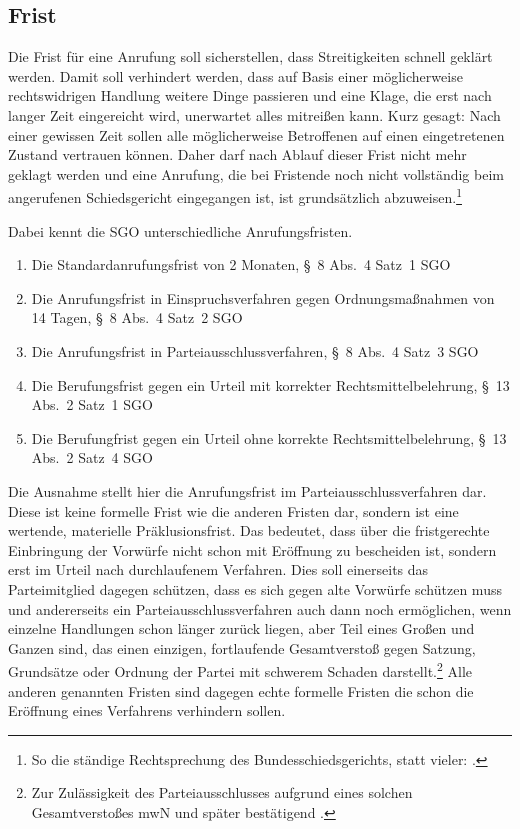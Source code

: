 \subsection{Frist}
\label{Standardworkflow:Frist}
Die Frist für eine Anrufung soll sicherstellen, dass Streitigkeiten schnell geklärt werden.
Damit soll verhindert werden, dass auf Basis einer möglicherweise rechtswidrigen Handlung weitere Dinge passieren und eine Klage, die erst nach langer Zeit eingereicht wird, unerwartet alles mitreißen kann.
Kurz gesagt: Nach einer gewissen Zeit sollen alle möglicherweise Betroffenen auf einen eingetretenen Zustand vertrauen können.
Daher darf nach Ablauf dieser Frist nicht mehr geklagt werden und eine Anrufung, die bei Fristende noch nicht vollständig beim angerufenen Schiedsgericht eingegangen ist, ist grundsätzlich abzuweisen.\footnote{So die ständige Rechtsprechung des Bundesschiedsgerichts, statt vieler: \cites{BSG2315HS}{BSG20130227}.}

Dabei kennt die SGO unterschiedliche Anrufungsfristen.
\begin{enumerate}
\item Die Standardanrufungsfrist von 2 Monaten, \S~8 Abs.~4 Satz~1 SGO
\item Die Anrufungsfrist in Einspruchsverfahren gegen Ordnungsmaßnahmen von 14 Tagen, \S~8 Abs.~4 Satz~2 SGO
\item Die Anrufungsfrist in Parteiausschlussverfahren, \S~8 Abs.~4 Satz~3 SGO
\item Die Berufungsfrist gegen ein Urteil mit korrekter Rechtsmittelbelehrung, \S~13 Abs.~2 Satz~1 SGO
\item Die Berufungfrist gegen ein Urteil ohne korrekte Rechtsmittelbelehrung, \S~13 Abs.~2 Satz~4 SGO
\end{enumerate}

Die Ausnahme stellt hier die Anrufungsfrist im Parteiausschlussverfahren dar.
Diese ist keine formelle Frist wie die anderen Fristen dar, sondern ist eine wertende, materielle Präklusionsfrist.
Das bedeutet, dass über die fristgerechte Einbringung der Vorwürfe nicht schon mit Eröffnung zu bescheiden ist, sondern erst im Urteil nach durchlaufenem Verfahren.
Dies soll einerseits das Parteimitglied dagegen schützen, dass es sich gegen alte Vorwürfe schützen muss und andererseits ein Parteiausschlussverfahren auch dann noch ermöglichen, wenn einzelne Handlungen schon länger zurück liegen, aber Teil eines Großen und Ganzen sind, das einen einzigen, fortlaufende Gesamtverstoß gegen Satzung, Grundsätze oder Ordnung der Partei mit schwerem Schaden darstellt.\footnote{Zur Zulässigkeit des Parteiausschlusses aufgrund eines solchen Gesamtverstoßes \cite[S.~19]{LSGHE20130624} mwN und später bestätigend \cite{BSG20131028}.}
Alle anderen genannten Fristen sind dagegen echte formelle Fristen die schon die Eröffnung eines Verfahrens verhindern sollen.

